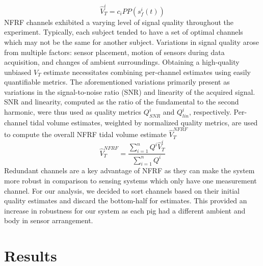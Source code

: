 \documentclass[journal]{IEEEtran}
\begin{document}
\begin{equation}
    \hat{V}^{i}_{T} = c_{i} PP(s_f^{i} (t))
    \label{eq:compute_tv}
\end{equation}
NFRF channels exhibited a varying level of signal quality throughout the experiment. Typically, each subject tended to have a set of optimal channels which may not be the same for another subject. Variations in signal quality arose from multiple factors: sensor placement, motion of sensors during data acquisition, and changes of ambient surroundings. Obtaining a high-quality unbiased $V_T$ estimate necessitates combining per-channel estimates using easily quantifiable metrics. The aforementioned variations primarily present as variations in the signal-to-noise ratio (SNR) and linearity of the acquired signal. SNR and linearity, computed as the ratio of the fundamental to the second harmonic, were thus used as quality metrics $Q^{i}_{SNR}$ and $Q^{i}_{lin}$, respectively. Per-channel tidal volume estimates, weighted by normalized quality metrics, are used to compute the overall NFRF tidal volume estimate $\hat{V}^{NFRF}_{T}$ 
\begin{equation}
    \hat{V}^{NFRF}_{T} = \frac{\sum_{i=1}^{n} Q^{i} \hat{V}^{i}_{T}}{\sum_{i=1}^{n} Q^{i}}
    \label{eq:combine_channels}
\end{equation}
Redundant channels are a key advantage of NFRF as they can make the system more robust in comparison to sensing systems which only have one measurement channel. For our analysis, we decided to sort channels based on their initial quality estimates and discard the bottom-half for estimates. This provided an increase in robustness for our system as each pig had a different ambient and body in sensor arrangement. 


\section{Results}
\end{document}
